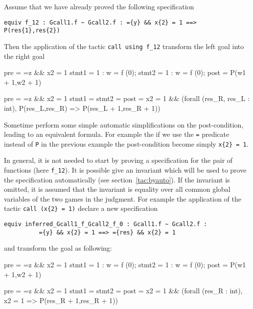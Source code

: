 \Example Assume that we have already proved the following specification
\begin{verbatim}
equiv f_12 : Gcall1.f ~ Gcall2.f : ={y} && x{2} = 1 ==> P(res{1},res{2})
\end{verbatim}
Then the application of the tactic \verb+call using f_12+ transform the
left goal into the right goal

\begin{minicode}{0.4}

pre   = ={z} && x{2} = 1
stmt1 =   1 : w = f (0);
stmt2 =   1 : w = f (0);
post  = P(w{1} + 1,w{2} + 1)
\end{minicode}
\begin{minicode}{0.6}
pre   = ={z} && x{2} = 1
stmt1 = 
stmt2 = 
post  = x{2} = 1 &&
         (forall (res_R, res_L : int),
            P(res_L,res_R) => P(res_L + 1,res_R + 1))

\end{minicode}

Sometime \easycrypt perform some simple automatic simplifications on the 
post-condition, leading to an equivalent formula. For example the if we use
the \verb+=+ predicate instead of \verb+P+ in the previous example the post-condition
become simply \verb+x{2} = 1+.

In general, it is not needed to start by proving a specification for the 
pair of functions (here \verb+f_12+). 
It is possible give an invariant which will be used to
prove the specification automatically (see section~\ref{tac:byauto}).
If the invariant is omitted, it is assumed that the invariant is equality
over all common global variables of the two games in the judgment.
For example the application of the tactic \verb+call (x{2} = 1)+ declare a new
specification 
\begin{verbatim}
equiv inferred_Gcall1_f_Gcall2_f_0 : Gcall1.f ~ Gcall2.f : 
          ={y} && x{2} = 1 ==> ={res} && x{2} = 1
\end{verbatim}
and transform the goal as following:

\begin{minicode}{0.4}

pre   = ={z} && x{2} = 1
stmt1 =   1 : w = f (0);
stmt2 =   1 : w = f (0);
post  = P(w{1} + 1,w{2} + 1)
\end{minicode}
\begin{minicode}{0.6}
pre   = ={z} && x{2} = 1
stmt1 = 
stmt2 = 
post  = x{2} = 1 &&
         (forall (res_R : int),  
            x{2} = 1 => P(res_R + 1,res_R + 1))

\end{minicode}
